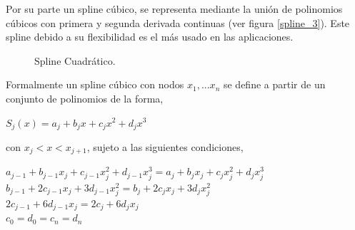 \hspace{0.4cm} Por su parte un spline c\'ubico, se representa mediante la uni\'on de polinomios c\'ubicos con primera y segunda derivada continuas (ver figura \ref{spline_3}). Este spline debido a su flexibilidad es el m\'as usado en las aplicaciones.


\begin{figure}[h]
\caption{Spline Cuadr\'atico.}
\label{spline_c}
\end{figure}


\hspace{0.4cm}Formalmente un spline c\'ubico con nodos $x_{1},...x_{n}$ se define a partir de un conjunto de polinomios de la forma,\\

\begin{center}

$\displaystyle{S_{j}(x) = a_{j} + b_{j}x +c_{j}x^2 +d_{j}x^3}$
\end{center}


\vspace{0.5cm}

\noindent con $x_{j}<x<x_{j+1}$, sujeto a las siguientes condiciones,\\


\begin{center}

$\displaystyle{a_{j-1} + b_{j-1}x_{j} +c_{j-1}x_{j}^2 +d_{j-1}x_{j}^3 = a_{j} + b_{j}x_{j} +c_{j}x_{j}^2 +d_{j}x_{j}^3}$\\
$\displaystyle{ b_{j-1} +2c_{j-1}x_{j} +3d_{j-1}x_{j}^2 = b_{j} +2c_{j}x_{j} +3d_{j}x_{j}^2}$\\
$\displaystyle{ 2c_{j-1} +6d_{j-1}x_{j} = 2c_{j} +6d_{j}x_{j}}$\\
$\displaystyle{ c_{0} = d_{0} = c_{n} =d_{n}}$

\end{center}

